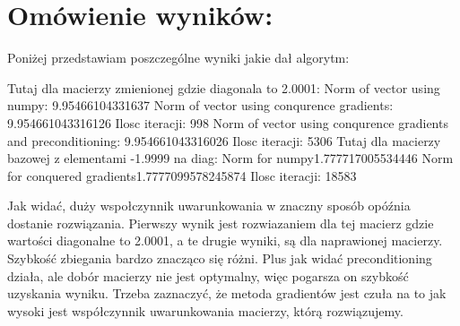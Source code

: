 \documentclass[12pt]{article}
\begin{document}
\section{Omówienie wyników:}
Poniżej przedstawiam poszczególne wyniki jakie dał algorytm:
\begin{center}
    Tutaj dla macierzy zmienionej gdzie diagonala to 2.0001:\newline\newline
    Norm of vector using numpy: 9.95466104331637\newline
    Norm of vector using conqurence gradients: 9.954661043316126\newline
    Ilosc iteracji: 998\newline
    Norm of vector using conqurence gradients and preconditioning: 9.954661043316026\newline
    Ilosc iteracji: 5306\newline\newline
    Tutaj dla macierzy bazowej z elementami -1.9999 na diag:\newline\newline
    Norm for numpy1.777717005534446\newline
    Norm for conquered gradients1.7777099578245874\newline
    Ilosc iteracji: 18583
    
\end{center}
Jak widać, duży wspołczynnik uwarunkowania w znaczny sposób opóźnia dostanie rozwiązania. Pierwszy wynik jest rozwiazaniem dla tej macierz gdzie wartości diagonalne to 2.0001, a te drugie wyniki, są dla naprawionej macierzy. Szybkość zbiegania bardzo znacząco się różni. Plus jak widać preconditioning działa, ale dobór macierzy nie jest optymalny, więc pogarsza on szybkość uzyskania wyniku. Trzeba zaznaczyć, że metoda gradientów jest czuła na to jak wysoki jest współczynnik uwarunkowania macierzy, którą rozwiązujemy.
\end{document}
